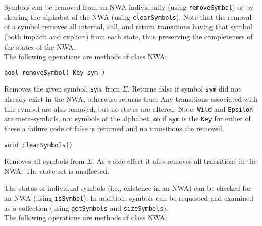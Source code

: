 Symbols can be removed from an NWA individually (using
\texttt{removeSymbol}) or by clearing the alphabet of the NWA (using
\texttt{clearSymbols}).  Note that the removal of a symbol removes all
internal, call, and return transitions having that symbol (both implicit and
explicit) from each state, thus preserving the completeness of the states of
the NWA. \\

\noindent The following operations are methods of class NWA:

\begin{description}

  \item\texttt{bool removeSymbol( Key sym )} \nopagebreak

    Removes the given symbol, \texttt{sym}, from $\Sigma$.  Returns false if
    symbol \texttt{sym} did not already exist in the NWA, otherwise returns
    true.  Any transitions associated with this symbol are also removed, but
    no states are altered.  Note: \texttt{Wild} and \texttt{Epsilon} are
    meta-symbols, not symbols of the alphabet, so if \texttt{sym} is the
    \texttt{Key} for either of these a failure code of false is returned and
    no transitions are removed.

  \item\texttt{void clearSymbols()} \nopagebreak

    Removes all symbols from $\Sigma$.  As a side effect it also removes all
    transitions in the NWA.  The state set is unaffected. \\

\end{description}

The status of individual symbols (i.e., existence in an NWA) can be checked
for an NWA (using \texttt{isSymbol}).  In addition, symbols
can be requested and examined as a collection (using \texttt{getSymbols} and
\texttt{sizeSymbols}). \\

\noindent The following operations are methods of class NWA:

